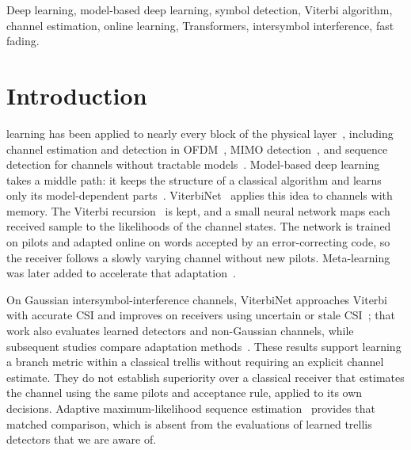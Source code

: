 \documentclass[journal]{IEEEtran}
\begin{document}
\begin{IEEEkeywords}
Deep learning, model-based deep learning, symbol detection, Viterbi algorithm, channel estimation, online learning, Transformers, intersymbol interference, fast fading.
\end{IEEEkeywords}

\section{Introduction}
 learning has been applied to nearly every block of the physical layer~\cite{oshea2017intro}, including channel estimation and detection in OFDM~\cite{ye2018power}, MIMO detection~\cite{samuel2019learning}, and sequence detection for channels without tractable models~\cite{farsad2018neural}. Model-based deep learning takes a middle path: it keeps the structure of a classical algorithm and learns only its model-dependent parts~\cite{shlezinger2023mbdl}. ViterbiNet~\cite{shlezinger2020viterbinet} applies this idea to channels with memory. The Viterbi recursion~\cite{forney1973viterbi,forney1972mlse} is kept, and a small neural network maps each received sample to the likelihoods of the channel states. The network is trained on pilots and adapted online on words accepted by an error-correcting code, so the receiver follows a slowly varying channel without new pilots. Meta-learning was later added to accelerate that adaptation~\cite{raviv2021metaviterbinet,raviv2023online}.

On Gaussian intersymbol-interference channels, ViterbiNet approaches Viterbi with accurate CSI and improves on receivers using uncertain or stale CSI~\cite{shlezinger2020viterbinet}; that work also evaluates learned detectors and non-Gaussian channels, while subsequent studies compare adaptation methods~\cite{raviv2021metaviterbinet,raviv2023online}. These results support learning a branch metric within a classical trellis without requiring an explicit channel estimate. They do not establish superiority over a classical receiver that estimates the channel using the same pilots and acceptance rule, applied to its own decisions. Adaptive maximum-likelihood sequence estimation~\cite{magee1973adaptive,raheli1995psp} provides that matched comparison, which is absent from the evaluations of learned trellis detectors that we are aware of.
\end{document}
